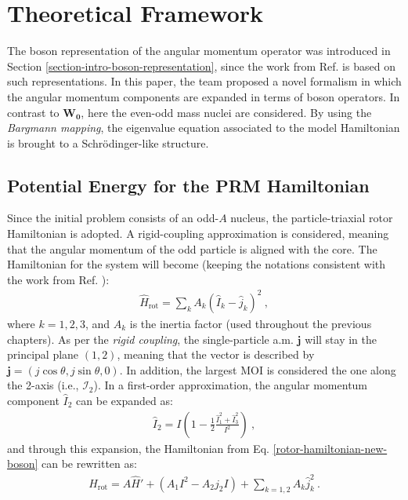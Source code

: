 \section{Theoretical Framework}
\label{section-new-boson-theoretical-framework}

The boson representation of the angular momentum operator was introduced in Section \ref{section-intro-boson-representation}, since the work from Ref. \cite{raduta2020new} is based on such representations. In this paper, the team proposed a novel formalism in which the angular momentum components are expanded in terms of boson operators. In contrast to $\mathbf{W_0}$, here the even-odd mass nuclei are considered. By using the \emph{Bargmann mapping}, the eigenvalue equation associated to the model Hamiltonian is brought to a Schrödinger-like structure.

\subsection{Potential Energy for the PRM Hamiltonian}

Since the initial problem consists of an odd-$A$ nucleus, the particle-triaxial rotor Hamiltonian is adopted. A rigid-coupling approximation is considered, meaning that the angular momentum of the odd particle is aligned with the core. The Hamiltonian for the system will become (keeping the notations consistent with the work from Ref. \cite{raduta2020new}):
\begin{align}
    \hat{H}_\text{rot}=\sum_{k}A_k\left(\hat{I}_k-\hat{j}_k\right)^2\ ,
    \label{rotor-hamiltonian-new-boson}
\end{align}
where $k=1,2,3$, and $A_k$ is the inertia factor (used throughout the previous chapters). As per the \emph{rigid coupling}, the single-particle a.m. $\mathbf{j}$ will stay in the principal plane $(1,2)$, meaning that the vector is described by $\mathbf{j}=\left(j\cos\theta,j\sin\theta,0\right)$. In addition, the largest MOI is considered the one along the 2-axis (i.e., $\mathcal{I}_2$). In a first-order approximation, the angular momentum component $\hat{I}_2$ can be expanded as:
\begin{align}
    \hat{I}_2=I\left(1-\frac{1}{2}\frac{\hat{I}_1^2+\hat{I}_3^2}{I^2}\right)\ ,
\end{align}
and through this expansion, the Hamiltonian from Eq. \ref{rotor-hamiltonian-new-boson} can be rewritten as:
\begin{align}
    \hat{H}_\text{rot}=A\hat{H}'+\left(A_1I^2-A_2j_2I\right)+\sum_{k=1,2}A_k\hat{j}_k^2\ .
    \label{rewritten-rotor-hamiltonian-new-boson}
\end{align}

